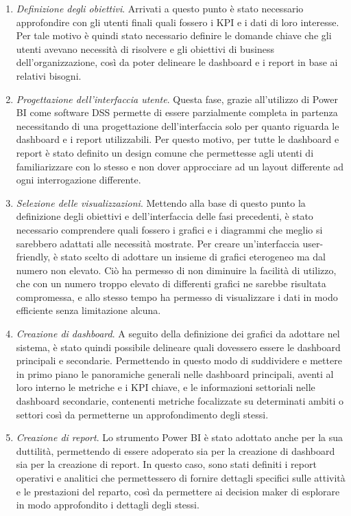 \begin{enumerate}
    \item \textit{Definizione degli obiettivi}. Arrivati a questo punto è stato necessario approfondire con gli utenti finali quali fossero i KPI e i dati di loro interesse. Per tale motivo è quindi stato necessario definire le domande chiave che gli utenti avevano necessità di risolvere e gli obiettivi di business dell'organizzazione, così da poter delineare le dashboard e i report in base ai relativi bisogni.
    \item \textit{Progettazione dell'interfaccia utente}. Questa fase, grazie all'utilizzo di Power BI come software DSS permette di essere parzialmente completa in partenza necessitando di una progettazione dell'interfaccia solo per quanto riguarda le dashboard e i report utilizzabili. Per questo motivo, per tutte le dashboard e report è stato definito un design comune che permettesse agli utenti di familiarizzare con lo stesso e non dover approcciare ad un layout differente ad ogni interrogazione differente.
    \item \textit{Selezione delle visualizzazioni}. Mettendo alla base di questo punto la definizione degli obiettivi e dell'interfaccia delle fasi precedenti, è stato necessario comprendere quali fossero i grafici e i diagrammi che meglio si sarebbero adattati alle necessità mostrate. Per creare un'interfaccia user-friendly, è stato scelto di adottare un insieme di grafici eterogeneo ma dal numero non elevato. Ciò ha permesso di non diminuire la facilità di utilizzo, che con un numero troppo elevato di differenti grafici ne sarebbe risultata compromessa, e allo stesso tempo ha permesso di visualizzare i dati in modo efficiente senza limitazione alcuna.
    \item \textit{Creazione di dashboard}. A seguito della definizione dei grafici da adottare nel sistema, è stato quindi possibile delineare quali dovessero essere le dashboard principali e secondarie. Permettendo in questo modo di suddividere e mettere in primo piano le panoramiche generali nelle dashboard principali, aventi al loro interno le metriche e i KPI chiave, e le informazioni settoriali nelle dashboard secondarie, contenenti metriche focalizzate su determinati ambiti o settori così da permetterne un approfondimento degli stessi.
    \item \textit{Creazione di report}. Lo strumento Power BI è stato adottato anche per la sua duttilità, permettendo di essere adoperato sia per la creazione di dashboard sia per la creazione di report. In questo caso, sono stati definiti i report operativi e analitici che permettessero di fornire dettagli specifici sulle attività e le prestazioni del reparto, così da permettere ai decision maker di esplorare in modo approfondito i dettagli degli stessi.
\end{enumerate}

